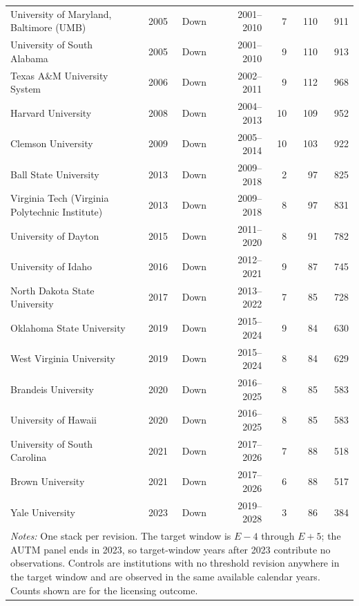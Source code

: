 {\begin{longtable}{p{5.8cm}rcrrrr}
University of Maryland, Baltimore (UMB) & 2005 & Down & 2001--2010 & 7 & 110 & 911 \\
University of South Alabama & 2005 & Down & 2001--2010 & 9 & 110 & 913 \\
Texas A\&M University System & 2006 & Down & 2002--2011 & 9 & 112 & 968 \\
Harvard University & 2008 & Down & 2004--2013 & 10 & 109 & 952 \\
Clemson University & 2009 & Down & 2005--2014 & 10 & 103 & 922 \\
Ball State University & 2013 & Down & 2009--2018 & 2 & 97 & 825 \\
Virginia Tech (Virginia Polytechnic Institute) & 2013 & Down & 2009--2018 & 8 & 97 & 831 \\
University of Dayton & 2015 & Down & 2011--2020 & 8 & 91 & 782 \\
University of Idaho & 2016 & Down & 2012--2021 & 9 & 87 & 745 \\
North Dakota State University & 2017 & Down & 2013--2022 & 7 & 85 & 728 \\
Oklahoma State University & 2019 & Down & 2015--2024 & 9 & 84 & 630 \\
West Virginia University & 2019 & Down & 2015--2024 & 8 & 84 & 629 \\
Brandeis University & 2020 & Down & 2016--2025 & 8 & 85 & 583 \\
University of Hawaii & 2020 & Down & 2016--2025 & 8 & 85 & 583 \\
University of South Carolina & 2021 & Down & 2017--2026 & 7 & 88 & 518 \\
Brown University & 2021 & Down & 2017--2026 & 6 & 88 & 517 \\
Yale University & 2023 & Down & 2019--2028 & 3 & 86 & 384 \\
\bottomrule
\multicolumn{7}{p{15.2cm}}{\footnotesize\textit{Notes:} One stack per revision. The target window is $E-4$ through $E+5$; the AUTM panel ends in 2023, so target-window years after 2023 contribute no observations. Controls are institutions with no threshold revision anywhere in the target window and are observed in the same available calendar years. Counts shown are for the licensing outcome.}
\end{longtable}
}

